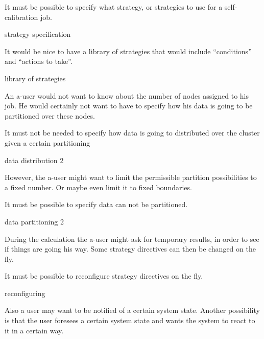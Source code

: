 \documentclass[]{lofar}
\begin{document}
        \begin{requirement}
          It must be possible to specify what strategy, or strategies
          to use for a self-calibration job.
          \caption{strategy specification\label{req:strategy-specification}}
        \end{requirement}

        \begin{requirement}
          It would be nice to have a library of strategies that would
          include ``conditions'' and ``actions to take''.
          \footnotemark[\value{footnote}]
          \caption{library of strategies\label{req:strategies}}
        \end{requirement}

        An a-user would not want to know about the number of nodes
        assigned to his job. He would certainly not want to have to
        specify how his data is going to be partitioned over these
        nodes. 

        \begin{requirement}
          It must not be needed to specify how data is going to
          distributed over the cluster given a certain partitioning
          \caption{data distribution 2\label{req:data-distribution-2}}
        \end{requirement}

        However, the a-user might want to limit the permissible
        partition possibilities to a fixed number. Or maybe even limit
        it to fixed boundaries.

        \begin{requirement}
          It must be possible to specify data can not be partitioned.
          \caption{data partitioning 2\label{req:data-partitioning-2}}
        \end{requirement}

        During the calculation the a-user might ask for temporary
        results, in order to see if things are going his way. Some
        strategy directives can then be changed on the fly.

        \begin{requirement}
          It must be possible to reconfigure strategy directives on
          the fly.
          \caption{reconfiguring\label{req:reconfiguring}}
        \end{requirement}

        Also a user may want to be notified of a certain system
        state. Another possibility is that the user foresees a certain
        system state and wants the system to react to it in a certain
        way.
\end{document}
